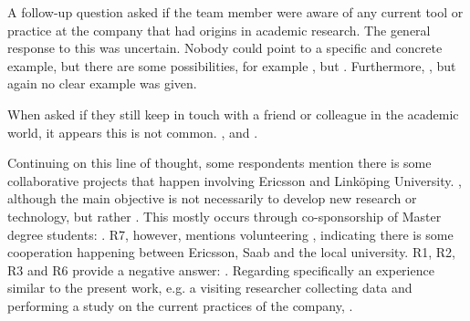 A follow-up question asked if the team member were aware of any current tool or practice at the company that had origins in academic research.
The general response to this was uncertain.
Nobody could point to a specific and concrete example, but there are some possibilities, for example , but .
Furthermore, , but again no clear example was given.

When asked if they still keep in touch with a friend or colleague in the academic world, it appears this is not common.
, and .

Continuing on this line of thought, some respondents mention there is some collaborative projects that happen involving Ericsson and Link\"oping University.
, although the main objective is not necessarily to develop new research or technology, but rather .
This mostly occurs through co-sponsorship of Master degree students: .
R7, however, mentions volunteering , indicating there is some cooperation happening between Ericsson, Saab and the local university.
R1, R2, R3 and R6 provide a negative answer: .
Regarding specifically an experience similar to the present work, e.g. a visiting researcher collecting data and performing a study on the current practices of the company, .

